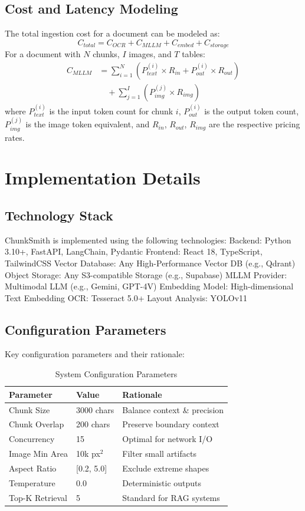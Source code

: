 \documentclass[conference]{IEEEtran}
\begin{document}
\subsection{Cost and Latency Modeling}
The total ingestion cost for a document can be modeled as:
\begin{equation}
C_{total} = C_{OCR} + C_{MLLM} + C_{embed} + C_{storage}
\end{equation}
For a document with $N$ chunks, $I$ images, and $T$ tables:
\begin{align}
C_{MLLM} &= \sum_{i=1}^{N} \left( P_{text}^{(i)} \times R_{in} + P_{out}^{(i)} \times R_{out} \right) \\
&\quad + \sum_{j=1}^{I} \left( P_{img}^{(j)} \times R_{img} \right)
\end{align}
where $P_{text}^{(i)}$ is the input token count for chunk $i$, $P_{out}^{(i)}$ is the output token count, $P_{img}^{(j)}$ is the image token equivalent, and $R_{in}$, $R_{out}$, $R_{img}$ are the respective pricing rates.

\section{Implementation Details}
\subsection{Technology Stack}
ChunkSmith is implemented using the following technologies:
{Backend}: Python 3.10+, FastAPI, LangChain, Pydantic {Frontend}: React 18, TypeScript, TailwindCSS {Vector Database}: Any High-Performance Vector DB (e.g., Qdrant) {Object Storage}: Any S3-compatible Storage (e.g., Supabase) {MLLM Provider}: Multimodal LLM (e.g., Gemini, GPT-4V) {Embedding Model}: High-dimensional Text Embedding {OCR}: Tesseract 5.0+
{Layout Analysis}: YOLOv11

\subsection{Configuration Parameters}
Key configuration parameters and their rationale:
\begin{table}[h]
\centering
\caption{System Configuration Parameters}
\begin{tabular}{@{}lll@{}}
\toprule
\textbf{Parameter} & \textbf{Value} & \textbf{Rationale} \\ \midrule
Chunk Size & 3000 chars & Balance context \& precision \\
Chunk Overlap & 200 chars & Preserve boundary context \\
Concurrency & 15 & Optimal for network I/O \\
Image Min Area & 10k px$^2$ & Filter small artifacts \\
Aspect Ratio & [0.2, 5.0] & Exclude extreme shapes \\
Temperature & 0.0 & Deterministic outputs \\
Top-K Retrieval & 5 & Standard for RAG systems \\ \bottomrule
\end{tabular}
\label{tab:config}
\end{table}
\end{document}
